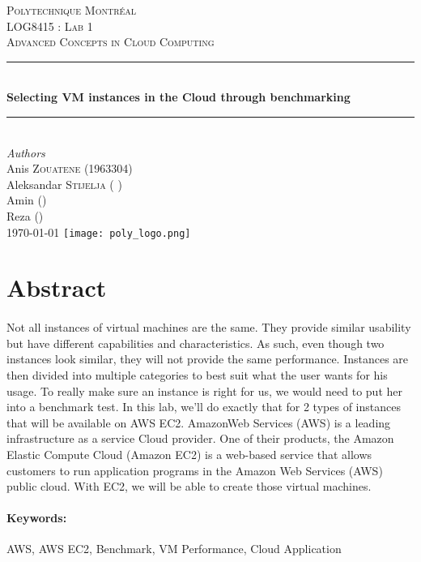 \documentclass[12pt]{article}
\begin{document}
\begin{titlepage} 
	\newcommand{\HRule}{\rule{\linewidth}{0.5mm}}
	\center
	\textsc{\LARGE Polytechnique Montréal}\\[1.5cm]
	\textsc{\Large LOG8415 : Lab 1}\\[0.5cm]
	\textsc{\large Advanced Concepts in Cloud Computing}\\[0.5cm]
	\HRule\\[0.4cm]
	{\huge\bfseries Selecting VM instances in the Cloud through
	benchmarking}\\[0.4cm]
	\HRule\\[1.5cm]
	{\large\textit{Authors}}\\
	Anis \textsc{Zouatene} (1963304)\\
	Aleksandar \textsc{Stijelja} ( )\\
	Amin \textsc{} ()\\
    Reza \textsc{} ()\\
	\vfill\vfill\vfill {\large\today} \vfill\vfill
	\texttt{[image: poly\_logo.png]}\\[1cm]
	\vfill
\end{titlepage}


\section{Abstract}
	\paragraph{} Not all instances of virtual machines are the same. 
    They provide similar usability but have different capabilities 
    and characteristics. As such, even though two instances look similar, 
    they will not provide the same performance. Instances are then divided 
    into multiple categories to best suit what the user wants for his usage. 
    To really make sure an instance is right for us, we would need to put her 
    into a benchmark test. In this lab, we’ll do exactly that for 2 types of 
    instances that will be available on AWS EC2. AmazonWeb Services (AWS) is 
    a leading infrastructure as a service Cloud provider. One of their products, 
    the Amazon Elastic Compute Cloud (Amazon EC2) is a web-based service that 
    allows customers to run application programs in the Amazon Web Services (AWS) 
    public cloud. With EC2, we will be able to create those virtual machines.

	\paragraph{Keywords:}AWS, AWS EC2, Benchmark, VM Performance, Cloud Application
	\pagebreak
\end{document}
